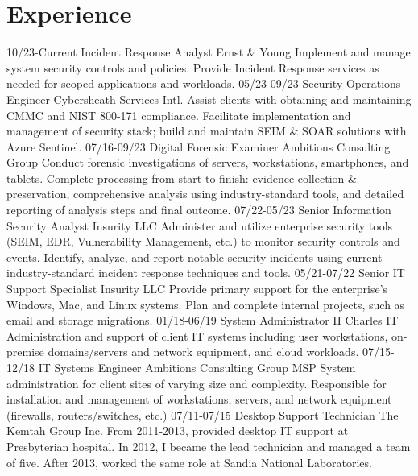 \documentclass[]{twentysecondcv}
\begin{document}
\section{Experience}
\begin{twenty}
  \twentyitem
  {10/23-Current}
  {Incident Response Analyst}
  {Ernst \& Young}
  {Implement and manage system security controls and policies. Provide Incident Response
    services as needed for scoped applications and workloads.}
  \twentyitem
  {05/23-09/23}
  {Security Operations Engineer}
  {Cybersheath Services Intl.}
  {Assist clients with obtaining and maintaining CMMC and NIST 800-171 compliance.
    Facilitate implementation and management of security stack; build and maintain
    SEIM \& SOAR solutions with Azure Sentinel.}
  \twentyitem
  {07/16-09/23}
  {Digital Forensic Examiner}
  {Ambitions Consulting Group}
  {Conduct forensic investigations of servers, workstations, smartphones, and
    tablets. Complete processing from start to finish: evidence collection \& preservation,
    comprehensive analysis using industry-standard tools, and detailed reporting of
    analysis steps and final outcome.}
  \twentyitem
  {07/22-05/23}
  {Senior Information Security Analyst}
  {Insurity LLC}
  {Administer and utilize enterprise security tools (SEIM, EDR, Vulnerability
    Management, etc.) to monitor security controls and events. Identify, analyze,
    and report notable security incidents using current industry-standard incident
    response techniques and tools.}
  \twentyitem
  {05/21-07/22}
  {Senior IT Support Specialist}
  {Insurity LLC}
  {Provide primary support for the enterprise's Windows, Mac, and Linux systems.
    Plan and complete internal projects, such as email and storage migrations.}
  \twentyitem
  {01/18-06/19}
  {System Administrator II}
  {Charles IT}
  {Administration and support of client IT systems including  user workstations,
    on-premise domains\slash servers and network equipment, and cloud workloads.}
  \twentyitem
  {07/15-12/18}
  {IT Systems Engineer}
  {Ambitions Consulting Group}
  {MSP System administration for client sites of varying size and complexity. Responsible
    for installation and management of workstations, servers, and network equipment
    (firewalls, routers/switches, etc.)}
  \twentyitem
  {07/11-07/15}
  {Desktop Support Technician}
  {The Kemtah Group Inc.}
  {From 2011-2013, provided desktop IT support at Presbyterian hospital. In 2012,
    I became the lead technician and managed a team of five. After 2013, worked the
    same role at Sandia National Laboratories.}

\end{twenty}
\end{document}

